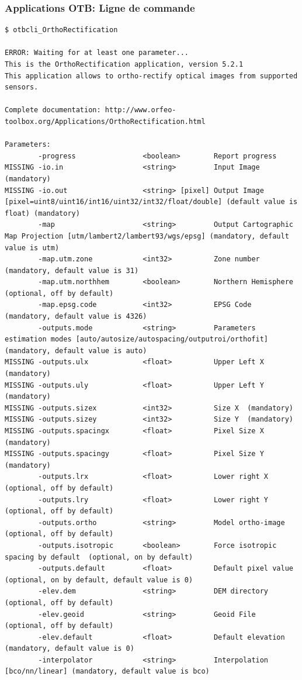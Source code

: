 \documentclass[8pt]{beamer}
\begin{document}
\begin{frame}[fragile]
\frametitle{Applications OTB: Ligne de commande}
\begin{scriptsize}
\vspace{-0.5cm}\begin{verbatim}
$ otbcli_OrthoRectification

ERROR: Waiting for at least one parameter...
This is the OrthoRectification application, version 5.2.1
This application allows to ortho-rectify optical images from supported sensors.

Complete documentation: http://www.orfeo-toolbox.org/Applications/OrthoRectification.html

Parameters:
        -progress                <boolean>        Report progress
MISSING -io.in                   <string>         Input Image  (mandatory)
MISSING -io.out                  <string> [pixel] Output Image  [pixel=uint8/uint16/int16/uint32/int32/float/double] (default value is float) (mandatory)
        -map                     <string>         Output Cartographic Map Projection [utm/lambert2/lambert93/wgs/epsg] (mandatory, default value is utm)
        -map.utm.zone            <int32>          Zone number  (mandatory, default value is 31)
        -map.utm.northhem        <boolean>        Northern Hemisphere  (optional, off by default)
        -map.epsg.code           <int32>          EPSG Code  (mandatory, default value is 4326)
        -outputs.mode            <string>         Parameters estimation modes [auto/autosize/autospacing/outputroi/orthofit] (mandatory, default value is auto)
MISSING -outputs.ulx             <float>          Upper Left X  (mandatory)
MISSING -outputs.uly             <float>          Upper Left Y  (mandatory)
MISSING -outputs.sizex           <int32>          Size X  (mandatory)
MISSING -outputs.sizey           <int32>          Size Y  (mandatory)
MISSING -outputs.spacingx        <float>          Pixel Size X  (mandatory)
MISSING -outputs.spacingy        <float>          Pixel Size Y  (mandatory)
        -outputs.lrx             <float>          Lower right X  (optional, off by default)
        -outputs.lry             <float>          Lower right Y  (optional, off by default)
        -outputs.ortho           <string>         Model ortho-image  (optional, off by default)
        -outputs.isotropic       <boolean>        Force isotropic spacing by default  (optional, on by default)
        -outputs.default         <float>          Default pixel value  (optional, on by default, default value is 0)
        -elev.dem                <string>         DEM directory  (optional, off by default)
        -elev.geoid              <string>         Geoid File  (optional, off by default)
        -elev.default            <float>          Default elevation  (mandatory, default value is 0)
        -interpolator            <string>         Interpolation [bco/nn/linear] (mandatory, default value is bco)
\end{verbatim}
\end{scriptsize}
\end{frame}
\end{document}
